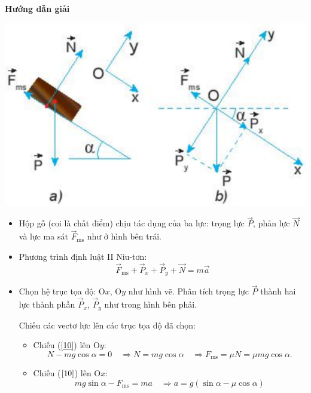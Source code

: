 {	\begin{center}
		\textbf{Hướng dẫn giải}
	\end{center}
	
	\begin{center}
		\includegraphics[scale=0.5]{../figs/G10-17-3}
	\end{center}
	
	\begin{itemize}
		\item Hộp gỗ (coi là chất điểm) chịu tác dụng của ba lực: trọng lực $\vec P$, phản lực $\vec N$ và lực ma sát $\vec F_\text{ms}$ như ở hình bên trái.
		
		\item Phương trình định luật II Niu-tơn:
		\begin{equation}\label{10}
			\vec F_\text{ms} + \vec P_x + \vec P_y + \vec N = m \vec a
		\end{equation}
	
		\item Chọn hệ trục tọa độ: O$x$, O$y$ như hình vẽ. Phân tích trọng lực $\vec P$ thành hai lực thành phần $\vec P_x$, $\vec P_y$ như trong hình bên phải.
		
		Chiếu các vectơ lực lên các trục tọa độ đã chọn:
			\begin{itemize}
				\item Chiếu (\ref{10}) lên O$y$:
					\begin{equation}\label{12}
						N - mg \cos \alpha = 0 \quad\Rightarrow N = mg\cos\alpha \quad\Rightarrow F_\text{ms}=\mu N=\mu mg \cos\alpha.
					\end{equation}
				\item Chiếu ($\ref{10}$) lên O$x$:
					\begin{equation}\label{11}
						mg \sin \alpha - F_\text{ms} = ma \quad\Rightarrow a= g(\sin \alpha - \mu \cos \alpha)
					\end{equation}
			\end{itemize}


\end{itemize}}
